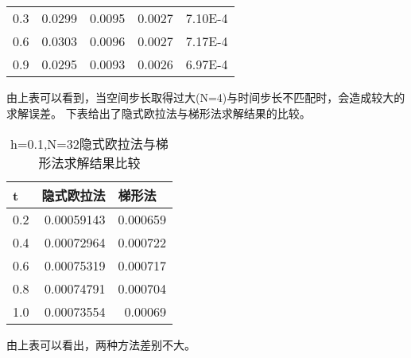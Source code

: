 \documentclass[10pt]{article}
\begin{document}
\begin{CJK}{GBK}{song}
\begin{table}[!ht]
\begin{tabular}{lllll}
0.3 & 0.0299 & 0.0095 & 0.0027 & 7.10E-4\\
0.6 & 0.0303 & 0.0096 & 0.0027 & 7.17E-4\\
0.9 & 0.0295 & 0.0093 & 0.0026 & 6.97E-4\\
\bottomrule[1.5pt]
\end{tabular}
\end{table}
由上表可以看到，当空间步长取得过大(N=4)与时间步长不匹配时，会造成较大的求解误差。
下表给出了隐式欧拉法与梯形法求解结果的比较。
\begin{table}[htbp]
  \centering
  \caption{h=0.1,N=32隐式欧拉法与梯形法求解结果比较}
    \begin{tabular}{rrr}
    \hline
  \multicolumn{1}{l}{t} &  \multicolumn{1}{l}{隐式欧拉法} & \multicolumn{1}{l}{梯形法} \\
  \hline
 0.2 &  0.00059143 & 0.000659 \\
 0.4&   0.00072964 & 0.000722 \\
 0.6&   0.00075319 & 0.000717 \\
 0.8&   0.00074791 & 0.000704 \\
 1.0&   0.00073554 & 0.00069 \\
 \hline
    \end{tabular}%
\end{table}%
  由上表可以看出，两种方法差别不大。
\end{CJK}
\end{document}
